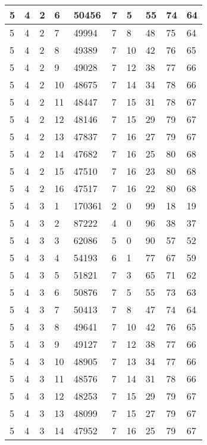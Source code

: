\begin{table}[!ht]
\begin{tabular}{|l|l|l|l|l|l|l|l|l|l|}
        5 & 4 & 2 & 6 & 50456 & 7 & 5 & 55 & 74 & 64 \\ \hline
        5 & 4 & 2 & 7 & 49994 & 7 & 8 & 48 & 75 & 64 \\ \hline
        5 & 4 & 2 & 8 & 49389 & 7 & 10 & 42 & 76 & 65 \\ \hline
        5 & 4 & 2 & 9 & 49028 & 7 & 12 & 38 & 77 & 66 \\ \hline
        5 & 4 & 2 & 10 & 48675 & 7 & 14 & 34 & 78 & 66 \\ \hline
        5 & 4 & 2 & 11 & 48447 & 7 & 15 & 31 & 78 & 67 \\ \hline
        5 & 4 & 2 & 12 & 48146 & 7 & 15 & 29 & 79 & 67 \\ \hline
        5 & 4 & 2 & 13 & 47837 & 7 & 16 & 27 & 79 & 67 \\ \hline
        5 & 4 & 2 & 14 & 47682 & 7 & 16 & 25 & 80 & 68 \\ \hline
        5 & 4 & 2 & 15 & 47510 & 7 & 16 & 23 & 80 & 68 \\ \hline
        5 & 4 & 2 & 16 & 47517 & 7 & 16 & 22 & 80 & 68 \\ \hline
        5 & 4 & 3 & 1 & 170361 & 2 & 0 & 99 & 18 & 19 \\ \hline
        5 & 4 & 3 & 2 & 87222 & 4 & 0 & 96 & 38 & 37 \\ \hline
        5 & 4 & 3 & 3 & 62086 & 5 & 0 & 90 & 57 & 52 \\ \hline
        5 & 4 & 3 & 4 & 54193 & 6 & 1 & 77 & 67 & 59 \\ \hline
        5 & 4 & 3 & 5 & 51821 & 7 & 3 & 65 & 71 & 62 \\ \hline
        5 & 4 & 3 & 6 & 50876 & 7 & 5 & 55 & 73 & 63 \\ \hline
        5 & 4 & 3 & 7 & 50413 & 7 & 8 & 47 & 74 & 64 \\ \hline
        5 & 4 & 3 & 8 & 49641 & 7 & 10 & 42 & 76 & 65 \\ \hline
        5 & 4 & 3 & 9 & 49127 & 7 & 12 & 38 & 77 & 66 \\ \hline
        5 & 4 & 3 & 10 & 48905 & 7 & 13 & 34 & 77 & 66 \\ \hline
        5 & 4 & 3 & 11 & 48576 & 7 & 14 & 31 & 78 & 66 \\ \hline
        5 & 4 & 3 & 12 & 48253 & 7 & 15 & 29 & 79 & 67 \\ \hline
        5 & 4 & 3 & 13 & 48099 & 7 & 15 & 27 & 79 & 67 \\ \hline
        5 & 4 & 3 & 14 & 47952 & 7 & 16 & 25 & 79 & 67 \\ \hline

\end{tabular}
\end{table}
